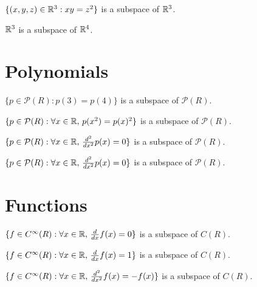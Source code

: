 \documentclass{homework}
\begin{document}
\begin{truefalse}
  $\{ (x,y,z) \in \mathbb{R}^3 : xy = z^2 \}$ is a subspace of $\mathbb{R}^3$.
\end{truefalse}

\begin{truefalse}
  $\mathbb{R}^3$ is a subspace of $\mathbb{R}^4$.
\end{truefalse}

\section{Polynomials}

\begin{truefalse}
  $\{ p \in \mathcal{P}(R) : p(3) = p(4) \}$ is a subspace of $\mathcal{P}(R)$.
\end{truefalse}

\begin{truefalse}
  $\{ p \in \mathcal{P}(R) : \forall x \in \mathbb{R},\, p(x^2) = p(x)^2 \}$ is a subspace of $\mathcal{P}(R)$.
\end{truefalse}

\begin{truefalse}
  $\{ p \in \mathcal{P}(R) : \forall x \in \mathbb{R},\, \frac{d^2}{dx^2} p(x) = 0 \}$ is a subspace of $\mathcal{P}(R)$.
\end{truefalse}

\begin{truefalse}
  $\{ p \in \mathcal{P}(R) : \forall x \in \mathbb{R},\, \frac{d^2}{dx^2} p(x) = 0 \}$ is a subspace of $\mathcal{P}(R)$.
\end{truefalse}

\section{Functions}

\begin{truefalse}
  $\{ f \in C^\infty(R) : \forall x \in \mathbb{R},\, \frac{d}{dx} f(x) = 0 \}$ is a subspace of $C(R)$.
\end{truefalse}

\begin{truefalse}
  $\{ f \in C^\infty(R) : \forall x \in \mathbb{R},\, \frac{d}{dx} f(x) = 1 \}$ is a subspace of $C(R)$.
\end{truefalse}

\begin{truefalse}
  $\{ f \in C^\infty(R) : \forall x \in \mathbb{R},\, \frac{d^2}{dx^2} f(x) = -f(x) \}$ is a subspace of $C(R)$.
\end{truefalse}
\end{document}
